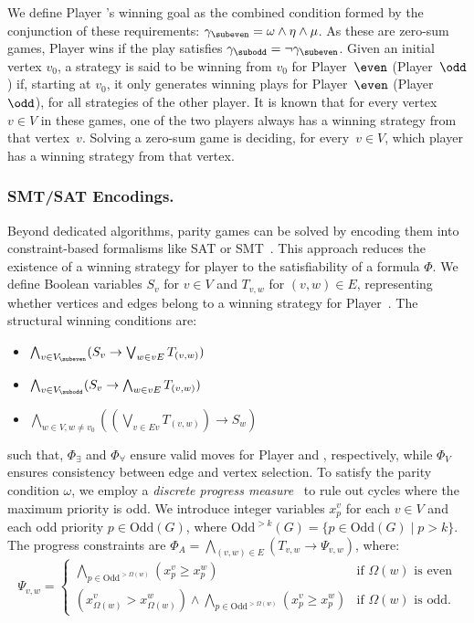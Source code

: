 \documentclass[runningheads]{llncs}
\begin{document}
We define Player \even's winning goal as the combined condition formed by the conjunction of these requirements:
$\gamma_{\subeven} = \omega \wedge \eta \wedge \mu$. As these are zero-sum games, Player \odd wins if the play satisfies $\gamma_{\subodd} = \neg \gamma_{\subeven}$.
%
Given an initial vertex $v_0$, a strategy is said to be winning from $v_0$ for Player~$\even$ (Player~$\odd$) if, starting at $v_0$, it only generates winning plays for Player~$\even$ (Player~$\odd$), for all strategies of the other player. It is known that for every vertex~$v\in V$ in these games, one of the two players always has a winning strategy from that vertex~$v$. Solving a zero-sum game is deciding, for every~$v\in V$, which player has a winning strategy from that vertex.

\subsubsection{SMT/SAT Encodings.}\label{sec:satencoding}

Beyond dedicated algorithms, parity games can be solved by encoding them into constraint-based formalisms like SAT or SMT~\cite{Heljanko:2012}. This approach reduces the existence of a winning strategy for player \even to the satisfiability of a formula $\Phi$. We define Boolean variables $S_v$ for $v \in V$ and $T_{v,w}$ for $(v, w) \in E$, representing whether vertices and edges belong to a winning strategy for Player~\even. The structural winning conditions are:

\begin{itemize}[leftmargin=1.5cm, itemsep=1.0ex, parsep=0pt]
    \item [$\Phi_\exists =$] $\bigwedge_{v \in V_{\subeven}} (S_v \rightarrow \bigvee_{w \in vE} T_{(v,w)})$ 
    \item [$\Phi_\forall =$] $\bigwedge_{v \in V_{\subodd}} (S_v \rightarrow \bigwedge_{w \in vE} T_{(v,w)})$
    \item [$\Phi_V =$] $\bigwedge_{w \in V, w \neq v_0} \left( \left(\bigvee_{v \in Ev} T_{(v,w)}\right) \rightarrow S_w \right)$
\end{itemize}
such that, 
$\Phi_\exists$ and $\Phi_\forall$ ensure valid moves for Player \even and \odd, respectively, while $\Phi_V$ ensures consistency between edge and vertex selection. To satisfy the parity condition $\omega$, we employ a \textit{discrete progress measure}~\cite{Jurdziński:2000} to rule out cycles where the maximum priority is odd. We introduce integer variables $x_p^v$ for each $v \in V$ and each odd priority $p \in \text{Odd}(G)$, where $\text{Odd}^{>k}(G) = \{p \in \text{Odd}(G) \mid p > k\}$. The progress constraints are $\Phi_A = \bigwedge_{(v,w) \in E} (T_{v,w} \to \Psi_{v,w})$, where:
%
\[
\Psi_{v,w} = 
\begin{cases} 
\bigwedge_{p \in \text{Odd}^{>\Omega(w)}} (x_p^v \geq x_p^w) & \text{if } \Omega(w) \text{ is even} \\
(x_{\Omega(w)}^v > x_{\Omega(w)}^w) \land \bigwedge_{p \in \text{Odd}^{>\Omega(w)}} (x_p^v \geq x_p^w) & \text{if } \Omega(w) \text{ is odd}.
\end{cases}
\]
\end{document}

